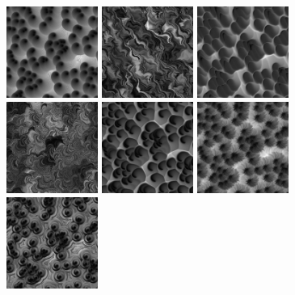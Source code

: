 \begin{figure}[htb]
\centering
\includegraphics[width=3cm,keepaspectratio]{obr/voro_02.jpg}
\includegraphics[width=3cm,keepaspectratio]{obr/voro_03.jpg}
\includegraphics[width=3cm,keepaspectratio]{obr/voro_04.jpg}
\includegraphics[width=3cm,keepaspectratio]{obr/voro_05.jpg}
\includegraphics[width=3cm,keepaspectratio]{obr/voro_06.jpg}
\includegraphics[width=3cm,keepaspectratio]{obr/voro_07.jpg}
\includegraphics[width=3cm,keepaspectratio]{obr/voro_08.jpg}

\end{figure}
